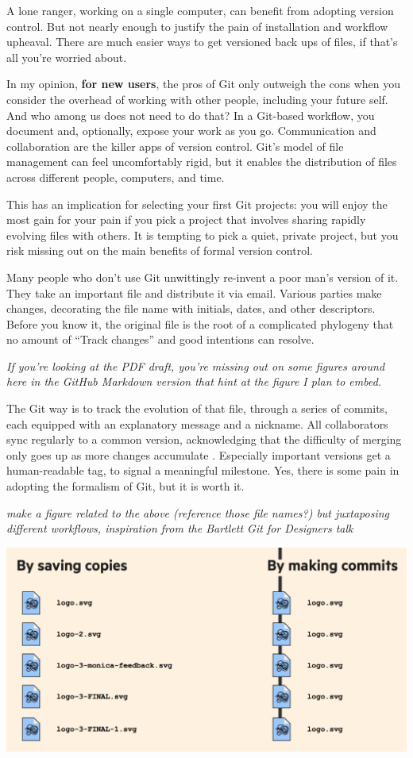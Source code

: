 \documentclass[12pt]{article}
\begin{document}
A lone ranger, working on a single computer, can benefit from adopting
version control. But not nearly enough to justify the pain of
installation and workflow upheaval. There are much easier ways to get
versioned back ups of files, if that's all you're worried about.

In my opinion, \textbf{for new users}, the pros of Git only outweigh the
cons when you consider the overhead of working with other people,
including your future self. And who among us does not need to do that?
In a Git-based workflow, you document and, optionally, expose your work
as you go. Communication and collaboration are the killer apps of
version control. Git's model of file management can feel uncomfortably
rigid, but it enables the distribution of files across different people,
computers, and time.

This has an implication for selecting your first Git projects: you will
enjoy the most gain for your pain if you pick a project that involves
sharing rapidly evolving files with others. It is tempting to pick a
quiet, private project, but you risk missing out on the main benefits of
formal version control.

Many people who don't use Git unwittingly re-invent a poor man's version
of it. They take an important file and distribute it via email. Various
parties make changes, decorating the file name with initials, dates, and
other descriptors. Before you know it, the original file is the root of
a complicated phylogeny that no amount of ``Track changes'' and good
intentions can resolve.

\emph{If you're looking at the PDF draft, you're missing out on some
figures around here in the GitHub Markdown version that hint at the
figure I plan to embed.}

The Git way is to track the evolution of that file, through a series of
commits, each equipped with an explanatory message and a nickname. All
collaborators sync regularly to a common version, acknowledging that the
difficulty of merging only goes up as more changes accumulate
\citep{good-enough}. Especially important versions get a human-readable
tag, to signal a meaningful milestone. Yes, there is some pain in
adopting the formalism of Git, but it is worth it.

\emph{make a figure related to the above (reference those file names?)
but juxtaposing different workflows, inspiration from the Bartlett Git
for Designers talk}

\includegraphics[width=1\linewidth]{bartlett-copies-vs-commits}
\end{document}
